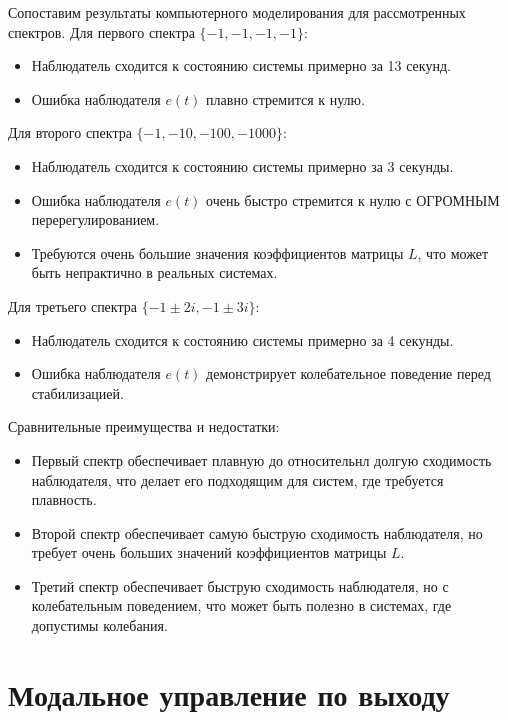 Сопоставим результаты компьютерного моделирования для рассмотренных спектров.
Для первого спектра $\{-1, -1, -1, -1\}$:
\begin{itemize}
    \item Наблюдатель сходится к состоянию системы примерно за 13 секунд.
    \item Ошибка наблюдателя $e(t)$ плавно стремится к нулю.
\end{itemize}
Для второго спектра $\{-1, -10, -100, -1000\}$:
\begin{itemize}
    \item Наблюдатель сходится к состоянию системы примерно за 3 секунды.
    \item Ошибка наблюдателя $e(t)$ очень быстро стремится к нулю с ОГРОМНЫМ
    перерегулированием.
    \item Требуются очень большие значения коэффициентов матрицы $L$, 
    что может быть непрактично в реальных системах.
\end{itemize}
Для третьего спектра $\{-1 \pm 2i, -1 \pm 3i\}$:
\begin{itemize}
    \item Наблюдатель сходится к состоянию системы примерно за 4 секунды.
    \item Ошибка наблюдателя $e(t)$ демонстрирует колебательное поведение 
    перед стабилизацией.
\end{itemize}
Сравнительные преимущества и недостатки:
\begin{itemize}
    \item Первый спектр обеспечивает плавную до относительнл долгую сходимость наблюдателя, 
    что делает его подходящим для систем, где требуется плавность.
    \item Второй спектр обеспечивает самую быструю сходимость наблюдателя, 
    но требует очень больших значений коэффициентов матрицы $L$.
    \item Третий спектр обеспечивает быструю сходимость наблюдателя,
    но с колебательным поведением, что может быть полезно в системах, 
    где допустимы колебания.
\end{itemize}



\section{Модальное управление по выходу}

